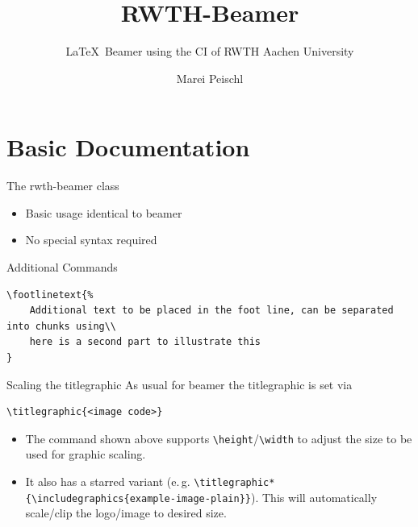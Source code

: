 \documentclass[
english,%
]{rwth-beamer}
\title{RWTH-Beamer}
\subtitle{\LaTeX~Beamer using the CI of RWTH Aachen University}
\author[M. Peischl]{Marei Peischl}
\institute{pei\TeX}
\newcommand*{\code}[1]{\texttt{#1}}
\begin{document}
\maketitle

\maketitle[titlegraphic=2:3]

\section{Basic Documentation}

\begin{frame}{The rwth-beamer class}
\begin{itemize}
\item Basic usage identical to beamer
\item No special syntax required
\end{itemize}
\end{frame}

\begin{frame}[fragile]{Additional Commands}
\begin{verbatim}
\footlinetext{%
	Additional text to be placed in the foot line, can be separated into chunks using\\
	here is a second part to illustrate this
}
\end{verbatim}
\end{frame}

\begin{frame}[fragile]{Scaling the titlegraphic}
As usual for beamer the titlegraphic is set via

\begin{verbatim}
\titlegraphic{<image code>}
\end{verbatim}

\begin{itemize}
\item The command shown above supports \code{\textbackslash{}height}/\code{\textbackslash{}width} to adjust the size to be used for graphic scaling.
\item It also has  a starred variant (e.\,g. \code{\textbackslash{}titlegraphic*\{\textbackslash{}includegraphics\{example-image-plain\}\}}). This will automatically scale/clip the logo/image to desired size.
\end{itemize}
\end{frame}
\end{document}
